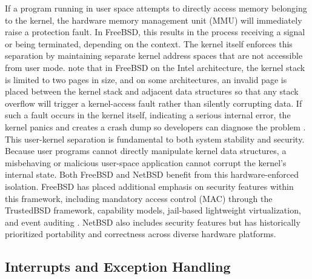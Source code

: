 If a program running in user space attempts to directly access memory belonging to the kernel, the hardware memory management unit (MMU) will immediately raise a protection fault. In FreeBSD, this results in the process receiving a signal or being terminated, depending on the context. The kernel itself enforces this separation by maintaining separate kernel address spaces that are not accessible from user mode. \textcite{watson2015} note that in FreeBSD on the Intel architecture, the kernel stack is limited to two pages in size, and on some architectures, an invalid page is placed between the kernel stack and adjacent data structures so that any stack overflow will trigger a kernel-access fault rather than silently corrupting data. If such a fault occurs in the kernel itself, indicating a serious internal error, the kernel panics and creates a crash dump so developers can diagnose the problem \parencite{watson2015}.
This user-kernel separation is fundamental to both system stability and security. Because user programs cannot directly manipulate kernel data structures, a misbehaving or malicious user-space application cannot corrupt the kernel's internal state. Both FreeBSD and NetBSD benefit from this hardware-enforced isolation. FreeBSD has placed additional emphasis on security features within this framework, including mandatory access control (MAC) through the TrustedBSD framework, capability models, jail-based lightweight virtualization, and event auditing \parencite{watson2015}. NetBSD also includes security features but has historically prioritized portability and correctness across diverse hardware platforms.

\subsection{Interrupts and Exception Handling}

